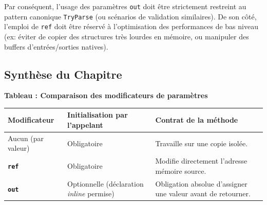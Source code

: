 Par conséquent, l'usage des paramètres \texttt{out} doit être strictement restreint au pattern canonique \texttt{TryParse} (ou scénarios de validation similaires). De son côté, l'emploi de \texttt{ref} doit être réservé à l'optimisation des performances de bas niveau (ex: éviter de copier des structures très lourdes en mémoire, ou manipuler des buffers d'entrées/sorties natives). 

\subsection{Synthèse du Chapitre}

\begin{center}
    \textbf{Tableau : Comparaison des modificateurs de paramètres} \\[0.3cm]
    \begin{tabular}{@{}llp{7cm}@{}}
        \toprule
        \textbf{Modificateur} & \textbf{Initialisation par l'appelant} & \textbf{Contrat de la méthode} \\
        \midrule
        Aucun (par valeur) & Obligatoire & Travaille sur une copie isolée. \\
        \textbf{\texttt{ref}} & Obligatoire & Modifie directement l'adresse mémoire source. \\
        \textbf{\texttt{out}} & Optionnelle (déclaration \emph{inline} permise) & Obligation absolue d'assigner une valeur avant de retourner. \\
        \bottomrule
    \end{tabular}
\end{center}
